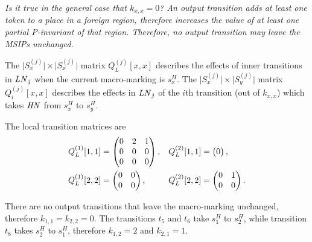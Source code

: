 \documentclass[a4paper,10pt,twoside,openright]{memoir}
\newcommand*{\LN}{\textnormal{\emph{LN}}}
\newcommand*{\HN}{\textnormal{\emph{HN}}}
\begin{document}
\emph{Is it true in the general case that $k_{x,x} = 0$? An output
  transition adds at least one token to a place in a \emph{foreign}
  region, therefore increases the value of at least one partial
  P-invariant of that region. Therefore, no output transition may
  leave the MSIPs unchanged.}

The $\lvert S^{(j)}_{x} \rvert \times \lvert S^{(j)}_{x} \rvert$
matrix $Q^{(j)}_L[x, x]$ describes the effects of inner transitions in
$\LN_j$ when the current macro-marking is $s^H_x$. The
$\lvert S^{(j)}_{x} \rvert \times \lvert S^{(j)}_{y} \rvert$ matrix
$Q^{(j)}_i[x, x]$ describes the effects in $\LN_j$ of the $i$th
transition (out of $k_{x, x}$) which takes $\HN$ from $s^H_x$ to
$s^H_y$.

The local transition matrices are
\begin{align}
  Q^{(1)}_L[1, 1] &= \begin{pmatrix}
    0 & 2 & 1 \\
    0 & 0 & 0 \\
    0 & 0 & 0
  \end{pmatrix} \text,
  & Q^{(2)}_L[1, 1] &= \begin{pmatrix}
    0
  \end{pmatrix} \text, \\
  Q^{(1)}_L[2, 2] &= \begin{pmatrix}
    0 & 0 \\
    0 & 0
  \end{pmatrix} \text, &
  Q^{(2)}_L[2, 2] &= \begin{pmatrix}
    0 & 1 \\
    0 & 0
  \end{pmatrix} \text.
\end{align}

There are no output transitions that leave the macro-marking
unchanged, therefore $k_{1, 1} = k_{2, 2} = 0$. The transitions $t_5$
and $t_6$ take $s^H_1$ to $s^H_2$, while transition $t_8$ takes
$s^H_2$ to $s^H_1$, therefore $k_{1, 2} = 2$ and $k_{2, 1} = 1$.
\end{document}
